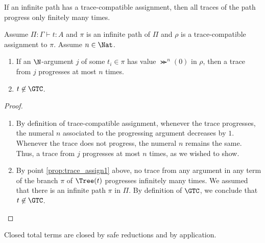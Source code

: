 If an infinite path has a trace-compatible assignment, then all traces of the path progress only finitely many times.

\begin{proposition}
\label{prop:trace_assign}
Assume $\Pi:\Gamma \vdash t:A$ and $\pi$ is an infinite path of $\Pi$ and
$\rho$ is a trace-compatible assignment to $\pi$. Assume $n \in \Nat$.
\begin{enumerate}
\item
\label{prop:trace_assign1}
If an $\N$-argument $j$ of some $t_i \in \pi$ has value $\Succ^n(0)$ in $\rho$, then a trace
from $j$ progresses at most $n$ times.
\item
\label{prop:trace_assign2}
$t \not \in \GTC$.
\end{enumerate}
\end{proposition}

\begin{proof}
\begin{enumerate}
\item
By definition of trace-compatible assignment, whenever the trace progresses, 
the numeral $n$ associated to the progressing argument decreases by $1$.
Whenever the trace does not progress, the numeral $n$ remains the same.
Thus, a trace from $j$ progresses at most $n$ times, as we wished to show.
\item
By point \ref{prop:trace_assign1} above, 
no trace from any argument in any term of the branch $\pi$ of $\Tree(t)$ progresses infinitely many times.
We assumed that there is an infinite path $\pi$ in $\Pi$.
By definition of $\GTC$, we conclude that $t \not \in \GTC$. 
\end{enumerate}
\end{proof}

Closed total terms are closed by safe reductions and by application. 

